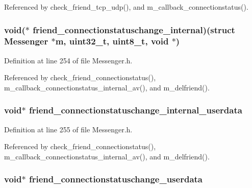 Referenced by check\+\_\+friend\+\_\+tcp\+\_\+udp(), and m\+\_\+callback\+\_\+connectionstatus().

\hypertarget{struct_messenger_abfd5a34f887ae1fda52d86f4b01ea572}{
\subsubsection[{friend\+\_\+connectionstatuschange\+\_\+internal}]{\setlength{\rightskip}{0pt plus 5cm}void($\ast$ friend\+\_\+connectionstatuschange\+\_\+internal)(struct {\bf Messenger} $\ast${\bf m}, uint32\+\_\+t, uint8\+\_\+t, void $\ast$)}}\label{struct_messenger_abfd5a34f887ae1fda52d86f4b01ea572}


Definition at line 254 of file Messenger.\+h.



Referenced by check\+\_\+friend\+\_\+connectionstatus(), m\+\_\+callback\+\_\+connectionstatus\+\_\+internal\+\_\+av(), and m\+\_\+delfriend().

\hypertarget{struct_messenger_af915663b78a533e88c4f56cacbeeefdc}{
\subsubsection[{friend\+\_\+connectionstatuschange\+\_\+internal\+\_\+userdata}]{\setlength{\rightskip}{0pt plus 5cm}void$\ast$ friend\+\_\+connectionstatuschange\+\_\+internal\+\_\+userdata}}\label{struct_messenger_af915663b78a533e88c4f56cacbeeefdc}


Definition at line 255 of file Messenger.\+h.



Referenced by check\+\_\+friend\+\_\+connectionstatus(), m\+\_\+callback\+\_\+connectionstatus\+\_\+internal\+\_\+av(), and m\+\_\+delfriend().

\hypertarget{struct_messenger_a69af1b3dc5153b752781cf61ff660b89}{
\subsubsection[{friend\+\_\+connectionstatuschange\+\_\+userdata}]{\setlength{\rightskip}{0pt plus 5cm}void$\ast$ friend\+\_\+connectionstatuschange\+\_\+userdata}}\label{struct_messenger_a69af1b3dc5153b752781cf61ff660b89}


